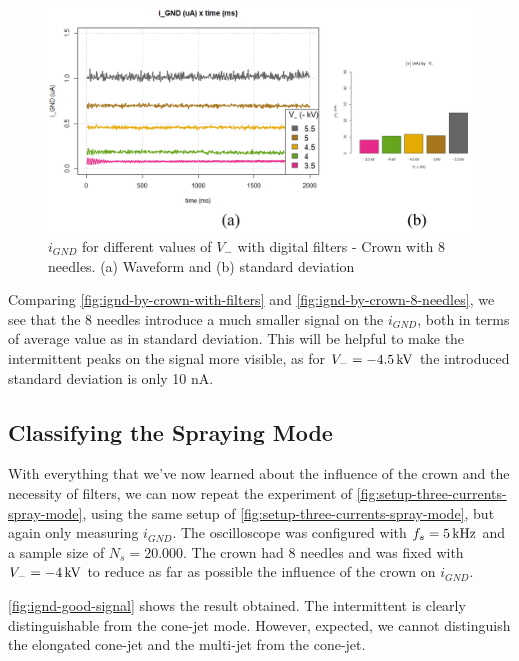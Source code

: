 \documentclass[oneside,12pt]{article}
\begin{document}
\begin{figure}[h!]
    \centering
    \includegraphics[width=1\textwidth,trim=1 1 1 1,clip]{figures/ignd-by-crown-8-needles.png}
    \caption{$i_{GND}$ for different values of $V_-$ with digital filters - Crown with 8 needles. (a) Waveform and (b) standard deviation}
    \label{fig:ignd-by-crown-8-needles}
\end{figure}

Comparing \autoref{fig:ignd-by-crown-with-filters} and \autoref{fig:ignd-by-crown-8-needles}, we see that the 8 needles introduce 
a much smaller signal on the $i_{GND}$, both in terms of average value as in standard deviation. This will be helpful to make  
the intermittent peaks on the signal more visible, as for $V_- = - 4.5 \,\mathrm{kV}$ the introduced standard deviation is only 10 nA.

\subsection{Classifying the Spraying Mode}

With everything that we've now learned about the influence of the crown and the necessity of filters, we can now repeat the experiment 
of \autoref{fig:setup-three-currents-spray-mode}, using the same setup of \autoref{fig:setup-three-currents-spray-mode}, but again only
measuring $i_{GND}$. The oscilloscope was configured with $f_s = 5 \,\mathrm{kHz}$ and a sample size of $N_s = 20.000$. The crown had 8 needles 
and was fixed with $V_- = - 4 \,\mathrm{kV}$ to reduce as far as possible the influence of the crown on $i_{GND}$.

\autoref{fig:ignd-good-signal} shows the result obtained. The intermittent is clearly distinguishable from the cone-jet mode. However, 
expected, we cannot distinguish the elongated cone-jet and the multi-jet from the cone-jet.
\end{document}
